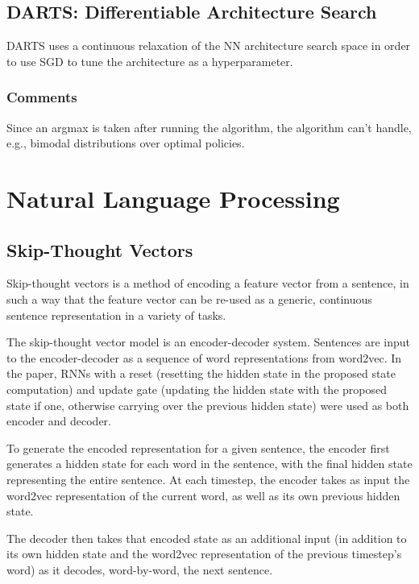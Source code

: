 \documentclass[a4paper, 12pt]{article}
\begin{document}
\subsection{DARTS: Differentiable Architecture Search~\cite{liu2018darts}}

DARTS uses a continuous relaxation of the NN architecture search space in order
to use SGD to tune the architecture as a hyperparameter.


\subsubsection{Comments}

Since an argmax is taken after running the algorithm, the algorithm can't
handle, e.g., bimodal distributions over optimal policies.


\section{Natural Language Processing}


\subsection{Skip-Thought Vectors~\citet{DBLP:journals/corr/KirosZSZTUF15}}

Skip-thought vectors is a method of encoding a feature vector from a sentence,
in such a way that the feature vector can be re-used as a generic, continuous
sentence representation in a variety of tasks.

The skip-thought vector model is an encoder-decoder system. Sentences are input
to the encoder-decoder as a sequence of word representations from word2vec. In
the paper, RNNs with a reset (resetting the hidden state in the proposed state
computation) and update gate (updating the hidden state with the proposed state
if one, otherwise carrying over the previous hidden state) were used as both
encoder and decoder.

To generate the encoded representation for a given sentence, the encoder first
generates a hidden state for each word in the sentence, with the final hidden
state representing the entire sentence. At each timestep, the encoder takes as
input the word2vec representation of the current word, as well as its own
previous hidden state.

The decoder then takes that encoded state as an additional input (in addition
to its own hidden state and the word2vec representation of the previous
timestep's word) as it decodes, word-by-word, the next sentence.
\end{document}
